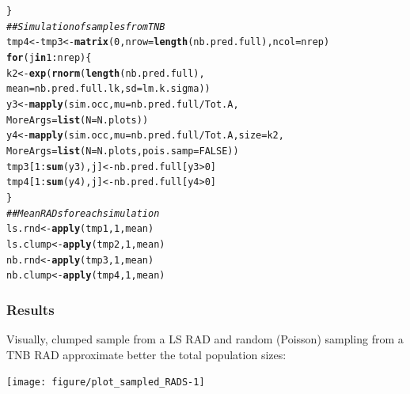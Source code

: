 \documentclass[12pt, A4]{article}\usepackage[]{graphicx}\usepackage[]{color}
\makeatletter
\newcommand{\hlnum}[1]{\textcolor[rgb]{0.686,0.059,0.569}{#1}}%
\newcommand{\hlcom}[1]{\textcolor[rgb]{0.678,0.584,0.686}{\textit{#1}}}%
\newcommand{\hlopt}[1]{\textcolor[rgb]{0,0,0}{#1}}%
\newcommand{\hlstd}[1]{\textcolor[rgb]{0.345,0.345,0.345}{#1}}%
\newcommand{\hlkwa}[1]{\textcolor[rgb]{0.161,0.373,0.58}{\textbf{#1}}}%
\newcommand{\hlkwb}[1]{\textcolor[rgb]{0.69,0.353,0.396}{#1}}%
\newcommand{\hlkwc}[1]{\textcolor[rgb]{0.333,0.667,0.333}{#1}}%
\newcommand{\hlkwd}[1]{\textcolor[rgb]{0.737,0.353,0.396}{\textbf{#1}}}%
\newenvironment{kframe}{%
 \def\at@end@of@kframe{}%
 \ifinner\ifhmode%
  \def\at@end@of@kframe{\end{minipage}}%
  \begin{minipage}{\columnwidth}%
 \fi\fi%
 \def\FrameCommand##1{\hskip\@totalleftmargin \hskip-\fboxsep
 \colorbox{shadecolor}{##1}\hskip-\fboxsep
     \hskip-\linewidth \hskip-\@totalleftmargin \hskip\columnwidth}%
 \MakeFramed {\advance\hsize-\width
   \@totalleftmargin\z@ \linewidth\hsize
   \@setminipage}}%
 {\par\unskip\endMakeFramed%
 \at@end@of@kframe}
\newenvironment{knitrout}{}{} %
\makeatother
\begin{document}
\begin{knitrout}
\begin{kframe}
\begin{alltt}
\hlstd{\}}
\hlcom{## Simulation of samples from TNB }
\hlstd{tmp4} \hlkwb{<-} \hlstd{tmp3} \hlkwb{<-} \hlkwd{matrix}\hlstd{(}\hlnum{0}\hlstd{,}\hlkwc{nrow}\hlstd{=}\hlkwd{length}\hlstd{(nb.pred.full),} \hlkwc{ncol}\hlstd{=nrep)}
\hlkwa{for}\hlstd{(j} \hlkwa{in} \hlnum{1}\hlopt{:}\hlstd{nrep)\{}
    \hlstd{k2} \hlkwb{<-} \hlkwd{exp}\hlstd{(}\hlkwd{rnorm}\hlstd{(}\hlkwd{length}\hlstd{(nb.pred.full),}
                    \hlkwc{mean}\hlstd{=nb.pred.full.lk,} \hlkwc{sd}\hlstd{=lm.k.sigma))}
    \hlstd{y3} \hlkwb{<-} \hlkwd{mapply}\hlstd{(sim.occ,} \hlkwc{mu} \hlstd{= nb.pred.full}\hlopt{/}\hlstd{Tot.A,}
                   \hlkwc{MoreArgs}\hlstd{=}\hlkwd{list}\hlstd{(}\hlkwc{N} \hlstd{= N.plots))}
    \hlstd{y4} \hlkwb{<-} \hlkwd{mapply}\hlstd{(sim.occ,} \hlkwc{mu} \hlstd{= nb.pred.full}\hlopt{/}\hlstd{Tot.A,} \hlkwc{size} \hlstd{= k2,}
                   \hlkwc{MoreArgs}\hlstd{=}\hlkwd{list}\hlstd{(}\hlkwc{N} \hlstd{= N.plots,} \hlkwc{pois.samp}\hlstd{=}\hlnum{FALSE}\hlstd{))}
    \hlstd{tmp3[}\hlnum{1}\hlopt{:}\hlkwd{sum}\hlstd{(y3),j]} \hlkwb{<-} \hlstd{nb.pred.full[y3}\hlopt{>}\hlnum{0}\hlstd{]}
    \hlstd{tmp4[}\hlnum{1}\hlopt{:}\hlkwd{sum}\hlstd{(y4),j]} \hlkwb{<-} \hlstd{nb.pred.full[y4}\hlopt{>}\hlnum{0}\hlstd{]}
\hlstd{\}}
\hlcom{## Mean RADs for each simulation}
\hlstd{ls.rnd} \hlkwb{<-} \hlkwd{apply}\hlstd{(tmp1,}\hlnum{1}\hlstd{,mean)}
\hlstd{ls.clump} \hlkwb{<-} \hlkwd{apply}\hlstd{(tmp2,}\hlnum{1}\hlstd{,mean)}
\hlstd{nb.rnd} \hlkwb{<-} \hlkwd{apply}\hlstd{(tmp3,}\hlnum{1}\hlstd{,mean)}
\hlstd{nb.clump} \hlkwb{<-} \hlkwd{apply}\hlstd{(tmp4,}\hlnum{1}\hlstd{,mean)}
\end{alltt}
\end{kframe}
\end{knitrout}


\subsubsection*{Results}

Visually, clumped sample from a LS RAD and random (Poisson) sampling
from a TNB RAD approximate better the total population sizes:

\begin{knitrout}
\color{fgcolor}

{\centering \texttt{[image: figure/plot\_sampled\_RADS-1]} 

}



\end{knitrout}
\end{document}
